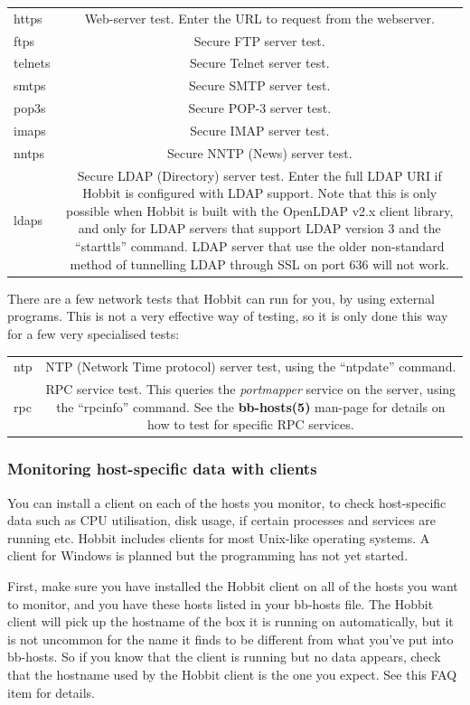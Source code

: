 \begin{tabular}{lc}
https &Web-server test. Enter the URL to request from the webserver. \\
ftps &Secure FTP server test. \\
telnets &Secure Telnet server test. \\
smtps &Secure SMTP server test. \\
pop3s &Secure POP-3 server test. \\
imaps &Secure IMAP server test. \\
nntps &Secure NNTP (News) server test. \\
ldaps &Secure LDAP (Directory) server test. Enter the full LDAP URI if Hobbit is configured with LDAP support. Note that this is only possible when Hobbit is built with the OpenLDAP v2.x client library, and only for LDAP servers that support LDAP version 3 and the ``starttls'' command. LDAP server that use the older non-standard method of tunnelling LDAP through SSL on port 636 will not work.

\end{tabular}



 There are a few network tests that Hobbit can run for you, by using external programs. This is not a very effective way of testing, so it is only done this way for a few very specialised tests:


\begin{tabular}{lc}
ntp &NTP (Network Time protocol) server test, using the ``ntpdate'' command. \\
rpc &RPC service test. This queries the \emph{portmapper}
 service on the server, using the ``rpcinfo'' command. See the \textbf{bb-hosts(5)}
 man-page for details on how to test for specific RPC services.

\end{tabular}

\subsubsection{Monitoring host-specific data with clients}


 You can install a client on each of the hosts you monitor, to check host-specific data such as CPU utilisation, disk usage, if certain processes and services are running etc. Hobbit includes clients for most Unix-like operating systems. A client for Windows is planned but the programming has not yet started.


 First, make sure you have installed the Hobbit client on all of the hosts you want to monitor, and you have these hosts listed in your bb-hosts file. The Hobbit client will pick up the hostname of the box it is running on automatically, but it is not uncommon for the name it finds to be different from what you've put into bb-hosts. So if you know that the client is running but no data appears, check that the hostname used by the Hobbit client is the one you expect. See this FAQ item for details.


